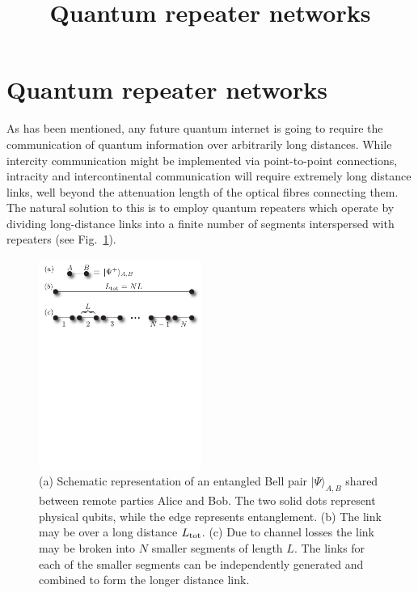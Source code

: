 \documentclass[twocolumn, aps, rmp, amsmath, amssymb, nofootinbib, superscriptaddress, longbibliography, floatfix, table-of-contents, eqsecnum]{revtex4-1}
\begin{document}
\title{Quantum repeater networks}

\maketitle

\section{Quantum repeater networks}

\tableofcontents 

As has been mentioned, any future quantum internet \cite{Kimble2008} is going to require the communication of quantum information over arbitrarily long distances. While intercity communication might be implemented via point-to-point connections, intracity and intercontinental communication will require extremely long distance links, well beyond the attenuation length of the optical fibres connecting them. The natural solution to this is to employ quantum repeaters \cite{Gisin2007, SSRG09, WJM2015} which operate by dividing long-distance links into a finite number of segments interspersed with repeaters (see Fig.~\ref{fig:repeaters_1}). 
\begin{figure}[!htb]
\includegraphics[width=0.475\textwidth]{repeaters_1}
\caption{(a) Schematic representation of an entangled Bell pair $| \Psi\rangle_{A,B}$ shared between remote parties Alice and Bob. The two solid dots represent physical qubits, while the edge represents entanglement. (b) The link may be over a long distance $L_{\rm tot}$. (c) Due to channel losses the link may be broken into $N$ smaller segments of length $L$. The links for each of the smaller segments can be independently generated and combined to form the longer distance link.} 
\label{fig:repeaters_1}
\end{figure} 
\end{document}
